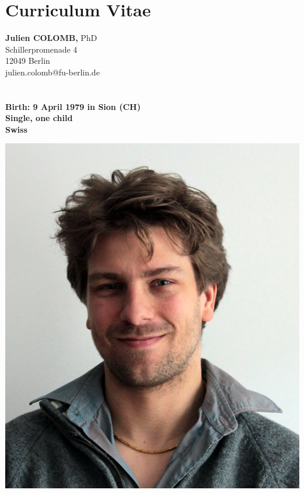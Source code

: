 
\section* {Curriculum Vitae}



\newcommand{\rubrique}[1]{{\textit{\textbf{\large#1}}}\smallskip\\}
\parindent=0in
\addtolength{\parskip}{1.4em}


\small

\begin{minipage}[t]{\textwidth}
    \begin{minipage}[b]{0.5\textwidth}
        \textbf{\Large Julien COLOMB}{\large \textbf, PhD}\\
        Schillerpromenade 4\\
        12049 Berlin\\
        julien.colomb@fu-berlin.de\\
        \\
        \\
        \textbf{Birth: 9 April 1979 in Sion (CH)}\\
        \textbf{Single, one child}\\
        \textbf{Swiss}
    \end{minipage}\hfill
    \begin{minipage}[b]{0.5\textwidth}
        \begin{flushright}
            \includegraphics[scale=1.3] {figures/photo_CV.jpg}

\end{flushright}
\end{minipage}
\end{minipage}
